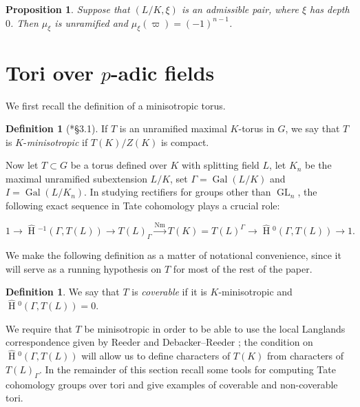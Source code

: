 \documentclass{mrlart7}
\theoremstyle{plain}
\newtheorem{proposition}[theorem]{Proposition}
\newcommand{\HT}[1]{\hat{\HH}{}^{#1}}
\theoremstyle{definition}
\newtheorem{definition}[theorem]{Definition}
\numberwithin{equation}{section}
\DeclareMathOperator{\Gal}{Gal}
\DeclareMathOperator{\HH}{H}
\DeclareMathOperator{\Nm}{Nm}
\DeclareMathOperator{\GL}{GL}
\begin{document}
\begin{proposition}\label{prop:BH_result1}
  Suppose that $(L/K, \xi)$ is an admissible pair, where $\xi$ has depth $0$.
  Then $\mu_{\xi}$ is unramified and
  $\mu_{\xi}(\varpi) = (-1)^{n-1}$.
\end{proposition}

\section{Tori over $p$-adic fields} \label{section:padic_tori}
We first recall the definition of a minisotropic torus.

\begin{definition}[{\cite{reeder:08a}*{\S3.1}}]\label{minisotropictorus}
If $T$ is an unramified maximal $K$-torus in $G$, we say that $T$ is $K$-\emph{minisotropic} if $T(K)/Z(K)$ is compact.
\end{definition}

Now let $T \subset G$ be a torus defined over $K$ with splitting field $L$, let $K_n$ be the maximal
unramified subextension $L/K$, set $\Gamma = \Gal(L/K)$ and $I = \Gal(L/K_n)$.
In studying rectifiers for groups other than $\GL_n$, the following exact sequence
in Tate cohomology plays a crucial role:

\begin{equation} \label{eq:tate4}
1 \rightarrow \HT{-1}(\Gamma,T(L)) \rightarrow T(L)_{\Gamma} \xrightarrow{\Nm} T(K)
  = T(L)^{\Gamma} \rightarrow \HT{0}(\Gamma,T(L)) \rightarrow 1.
\end{equation}

\noindent We make the following definition as a matter of notational convenience, since
it will serve as a running hypothesis on $T$ for most of the rest of the paper.

\begin{definition} \label{def:coverable}
We say that $T$ is \emph{coverable} if it is $K$-minisotropic and $\HT{0}(\Gamma, T(L)) = 0$.
\end{definition}

We require that $T$ be minisotropic in order to be able to use the local Langlands correspondence
given by Reeder \cite{reeder:08a} and Debacker--Reeder \cite{reeder-debacker:09a}; the condition
on $\HT{0}(\Gamma, T(L))$ will allow us to define characters of $T(K)$ from characters of
$T(L)_\Gamma$.  In the remainder of this section recall some tools for computing Tate cohomology
groups over tori and give examples of coverable and non-coverable tori.
\end{document}
